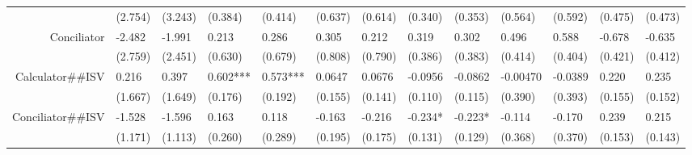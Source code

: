 \begin{tabular}{rrrrrrrrrrrrr}
      & \multicolumn{1}{l}{(2.754)} & \multicolumn{1}{l}{(3.243)} & \multicolumn{1}{l}{(0.384)} & \multicolumn{1}{l}{(0.414)} & \multicolumn{1}{l}{(0.637)} & \multicolumn{1}{l}{(0.614)} & \multicolumn{1}{l}{(0.340)} & \multicolumn{1}{l}{(0.353)} & \multicolumn{1}{l}{(0.564)} & \multicolumn{1}{l}{(0.592)} & \multicolumn{1}{l}{(0.475)} & \multicolumn{1}{l}{(0.473)} \\
Conciliator & \multicolumn{1}{l}{-2.482} & \multicolumn{1}{l}{-1.991} & \multicolumn{1}{l}{0.213} & \multicolumn{1}{l}{0.286} & \multicolumn{1}{l}{0.305} & \multicolumn{1}{l}{0.212} & \multicolumn{1}{l}{0.319} & \multicolumn{1}{l}{0.302} & \multicolumn{1}{l}{0.496} & \multicolumn{1}{l}{0.588} & \multicolumn{1}{l}{-0.678} & \multicolumn{1}{l}{-0.635} \\
      & \multicolumn{1}{l}{(2.759)} & \multicolumn{1}{l}{(2.451)} & \multicolumn{1}{l}{(0.630)} & \multicolumn{1}{l}{(0.679)} & \multicolumn{1}{l}{(0.808)} & \multicolumn{1}{l}{(0.790)} & \multicolumn{1}{l}{(0.386)} & \multicolumn{1}{l}{(0.383)} & \multicolumn{1}{l}{(0.414)} & \multicolumn{1}{l}{(0.404)} & \multicolumn{1}{l}{(0.421)} & \multicolumn{1}{l}{(0.412)} \\
Calculator\#\#ISV & \multicolumn{1}{l}{0.216} & \multicolumn{1}{l}{0.397} & \multicolumn{1}{l}{0.602***} & \multicolumn{1}{l}{0.573***} & \multicolumn{1}{l}{0.0647} & \multicolumn{1}{l}{0.0676} & \multicolumn{1}{l}{-0.0956} & \multicolumn{1}{l}{-0.0862} & \multicolumn{1}{l}{-0.00470} & \multicolumn{1}{l}{-0.0389} & \multicolumn{1}{l}{0.220} & \multicolumn{1}{l}{0.235} \\
      & \multicolumn{1}{l}{(1.667)} & \multicolumn{1}{l}{(1.649)} & \multicolumn{1}{l}{(0.176)} & \multicolumn{1}{l}{(0.192)} & \multicolumn{1}{l}{(0.155)} & \multicolumn{1}{l}{(0.141)} & \multicolumn{1}{l}{(0.110)} & \multicolumn{1}{l}{(0.115)} & \multicolumn{1}{l}{(0.390)} & \multicolumn{1}{l}{(0.393)} & \multicolumn{1}{l}{(0.155)} & \multicolumn{1}{l}{(0.152)} \\
Conciliator\#\#ISV & \multicolumn{1}{l}{-1.528} & \multicolumn{1}{l}{-1.596} & \multicolumn{1}{l}{0.163} & \multicolumn{1}{l}{0.118} & \multicolumn{1}{l}{-0.163} & \multicolumn{1}{l}{-0.216} & \multicolumn{1}{l}{-0.234*} & \multicolumn{1}{l}{-0.223*} & \multicolumn{1}{l}{-0.114} & \multicolumn{1}{l}{-0.170} & \multicolumn{1}{l}{0.239} & \multicolumn{1}{l}{0.215} \\
      & \multicolumn{1}{l}{(1.171)} & \multicolumn{1}{l}{(1.113)} & \multicolumn{1}{l}{(0.260)} & \multicolumn{1}{l}{(0.289)} & \multicolumn{1}{l}{(0.195)} & \multicolumn{1}{l}{(0.175)} & \multicolumn{1}{l}{(0.131)} & \multicolumn{1}{l}{(0.129)} & \multicolumn{1}{l}{(0.368)} & \multicolumn{1}{l}{(0.370)} & \multicolumn{1}{l}{(0.153)} & \multicolumn{1}{l}{(0.143)} \\

\end{tabular}
